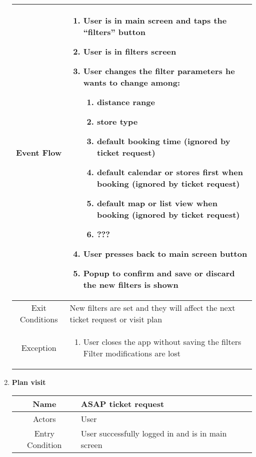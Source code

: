 \begin{enumerate}
\begin{table}[H]
{\begin{tabular}{|c|p{14cm}|}
		Event Flow & \begin{enumerate}
			\item User is in main screen and taps the “filters” button
			\item User is in filters screen
			\item User changes the filter parameters he wants to change among:
			\begin{enumerate}
				\item distance range
				\item store type
				\item default booking time (ignored by ticket request)
				\item default calendar or stores first when booking (ignored by ticket request)
				\item default map or list view when booking (ignored by ticket request)
				\item ???
			\end{enumerate}
			
			\item User presses back to main screen button
			\item Popup to confirm and save or discard the new filters is shown 

		\end{enumerate}\\
		
		\hline
		Exit Conditions & New filters are set and they will affect the next ticket request or visit plan\\
		\hline
	
		Exception & \begin{enumerate}
			\item User closes the app without saving the filters\newline
			Filter modifications are lost
			
		\end{enumerate}\\
		
		\hline
	\end{tabular}
}
\end{table}

\item \textbf{Plan visit}

\begin{table}[H]
{
	\begin{tabular}{|c|p{14cm}|}
		\hline
		Name & ASAP ticket request\\
		\hline
		Actors & User\\
		\hline
		Entry Condition & User successfully logged in and is in main screen\\
		\hline
		

\end{tabular}}
\end{table}
\end{enumerate}
